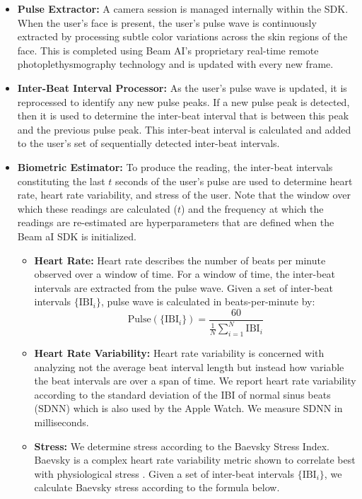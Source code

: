 \documentclass{article}
\begin{document}
\begin{itemize}
    \item \textbf{Pulse Extractor:} A camera session is managed internally within the SDK. When the user's face is present, the user’s pulse wave is continuously extracted by processing subtle color variations across the skin regions of the face. This is completed using Beam AI's proprietary real-time remote photoplethysmography technology and is updated with every new frame.
    \item \textbf{Inter-Beat Interval Processor:} As the user's pulse wave is updated, it is reprocessed to identify any new pulse peaks. If a new pulse peak is detected, then it is used to determine the inter-beat interval that is between this peak and the previous pulse peak. This inter-beat interval is calculated and added to the user's set of sequentially detected inter-beat intervals.
    \item \textbf{Biometric Estimator:} To produce the reading, the inter-beat intervals constituting the last $t$ seconds of the user's pulse are used to determine heart rate, heart rate variability, and stress of the user. Note that the window over which these readings are calculated ($t$) and the frequency at which the readings are re-estimated are hyperparameters that are defined when the Beam aI SDK is initialized.
    \begin{itemize}
    \item \textbf{Heart Rate:} Heart rate describes the number of beats per minute observed over a window of time. For a window of time, the inter-beat intervals are extracted from the pulse wave. Given a set of inter-beat intervals $\{\text{IBI}_i\}$, pulse wave is calculated in beats-per-minute by:
    \begin{equation}
        \text{Pulse}(\{\text{IBI}_i\}) = \frac{60}{\frac{1}{N} \sum_{i=1}^N \text{IBI}_i}
    \end{equation}
    \item \textbf{Heart Rate Variability:} Heart rate variability is concerned with analyzing not the average beat interval length but instead how variable the beat intervals are over a span of time. We report heart rate variability according to the standard deviation of the IBI of normal sinus beats (SDNN) which is also used by the Apple Watch. We measure SDNN in milliseconds.
    \item \textbf{Stress:} We determine stress according to the Baevsky Stress Index. Baevsky is a complex heart rate variability metric shown to correlate best with physiological stress \cite{BaevskyStressIndex}. Given a set of inter-beat intervals $\{\text{IBI}_i\}$, we calculate Baevsky stress according to the formula below.

\end{itemize}
\end{itemize}
\end{document}
